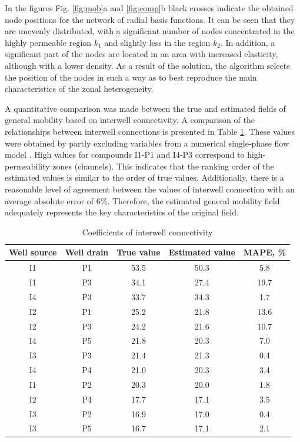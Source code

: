 \documentclass[
11pt,%
tightenlines,%
twoside,%
onecolumn,%
nofloats,%
nobibnotes,%
nofootinbib,%
superscriptaddress,%
noshowpacs,%
centertags]%
{revtex4}
\begin{document}
In the figures Fig. \ref{fig:mob}a and \ref{fig:comp}b black crosses indicate the obtained node positions for the network of radial basis functions. It can be seen that they are unevenly distributed, with a significant number of nodes concentrated in the highly permeable region $k_1$ and slightly less in the region $k_2$. In addition, a significant part of the nodes are located in an area with increased elasticity, although with a lower density.
As a result of the solution, the algorithm selects the position of the nodes in such a way as to best reproduce the main characteristics of the zonal heterogeneity.

A quantitative comparison was made between the true and estimated fields of general mobility based on interwell connectivity. A comparison of the relationships between interwell connections is presented in Table \ref{tabl:connection}. These values were obtained by partly excluding variables from a numerical single-phase flow model \cite{and}. High values for compounds I1-P1 and I4-P3 correspond to high-permeability zones (channels). This indicates that the ranking order of the estimated values is similar to the order of true values. Additionally, there is a reasonable level of agreement between the values of interwell connection with an average absolute error of 6\%. Therefore, the estimated general mobility field adequately represents the key characteristics of the original field. 

\begin{table}[h!]
	\caption{Coefficients of interwell connectivity}	
	\label{tabl:connection}	
	\begin{center}
		\begin{tabular}{c|c|c|c|c}
			\hline
			Well source &  Well drain & True value & Estimated  value & MAPE, \% \\
			\hline
				I1 & P1 & 53.5 & 50.3 & 5.8 \\
				I1 & P3 & 34.1 & 27.4 & 19.7 \\
				I4 & P3 & 33.7 & 34.3 & 1.7 \\
				I2 & P1 & 25.2 & 21.8 & 13.6 \\
				I2 & P3 & 24.2 & 21.6 & 10.7 \\
				I4 & P5 & 21.8 & 20.3 & 7.0 \\
				I3 & P3 & 21.4 & 21.3 & 0.4 \\
				I4 & P4 & 21.0 & 20.3 & 3.4 \\
				I1 & P2 & 20.3 & 20.0 & 1.8 \\
				I2 & P4 & 17.7 & 17.1 & 3.5 \\
				I3 & P2 & 16.9 & 17.0 & 0.4 \\
				I3 & P5 & 16.7 & 17.1 & 2.1 \\
			\hline
		\end{tabular}
	\end{center}
\end{table}
\end{document}
